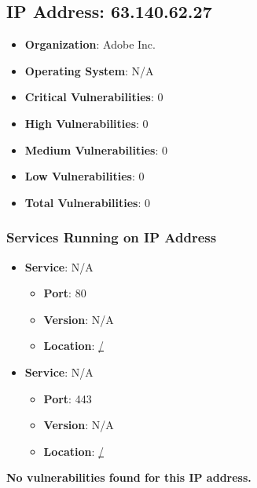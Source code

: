 \documentclass{article}
\begin{document}
\clearpage



\subsection*{IP Address: 63.140.62.27}

\begin{itemize}
    \item \textbf{Organization}: Adobe Inc.
    \item \textbf{Operating System}:  N/A 
    \item \textbf{Critical Vulnerabilities}: 0
    \item \textbf{High Vulnerabilities}: 0
    \item \textbf{Medium Vulnerabilities}: 0
    \item \textbf{Low Vulnerabilities}: 0
    \item \textbf{Total Vulnerabilities}: 0
\end{itemize}

\subsubsection*{Services Running on IP Address}

\begin{itemize}
    
        \item \textbf{Service}: N/A
        \begin{itemize}
            \item \textbf{Port}: 80
            \item \textbf{Version}:  N/A 
            \item \textbf{Location}: \href{ / }{ / }
        \end{itemize}
    
        \item \textbf{Service}: N/A
        \begin{itemize}
            \item \textbf{Port}: 443
            \item \textbf{Version}:  N/A 
            \item \textbf{Location}: \href{ / }{ / }
        \end{itemize}
    
\end{itemize}


\textbf{No vulnerabilities found for this IP address.}
\end{document}
